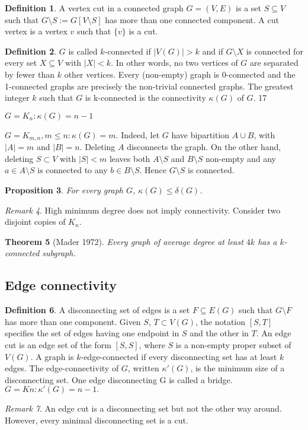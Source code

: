 \documentclass[11pt, fleqn, a4paper, landscape]{article}
\theoremstyle{plain} %
\newtheorem{thm}{Theorem}
\newtheorem{pro}[thm]{Proposition}
\theoremstyle{remark} %
\newtheorem{rem}[thm]{Remark}
\theoremstyle{definition} %
\newtheorem{defi}[thm]{Definition}
\begin{document}
\begin{multicols}{3}
\begin{defi}
A vertex cut in a connected graph $G = (V,E)$ is a set $ S \subseteq V$ such that $G\setminus S := G[V \setminus S]$ has more than one connected component. A cut vertex is a vertex $v$ such that $\{v\}$ is a cut.
\end{defi}
\begin{defi}
$G$ is called $k$-connected if $|V (G)|> k$ and if $G\setminus X$ is connected for every set $X \subseteq V$ with $|X|< k$. In other words, no two vertices of $G$ are separated by fewer than $k$ other vertices. Every (non-empty) graph is 0-connected and the 1-connected graphs are precisely the non-trivial connected graphs. The greatest integer $k$ such that $G$ is k-connected is the connectivity $\kappa (G)$ of $G$.
17
\item $G = K_n: \kappa (G) = n - 1$
\item $G = K_{m,n}, m \le n: \kappa (G) = m$. Indeed, let $G$ have bipartition $A \cup B$, with $|A|= m$  and $|B|= n$. Deleting $A$ disconnects the graph. On the other hand, deleting $S \subset V$ with $|S|< m$ leaves both $A\setminus S$ and $B\setminus S$ non-empty and any $a \in A\setminus S$ is connected to any $b \in B \setminus S$. Hence $G\setminus S$ is connected.
\end{defi}
\begin{pro}
For every graph $G$, $\kappa (G) \le \delta(G)$.
\end{pro} 

\begin{rem}
High minimum degree does not imply connectivity. Consider two disjoint copies of $K_n$.
\end{rem}
\begin{thm}[Mader 1972]
Every graph of average degree at least $4k$ has a $k$-connected subgraph.
\end{thm}

\subsection{Edge connectivity}
\begin{defi}
A disconnecting set of edges is a set $F \subseteq E(G)$ such that $G\setminus F$ has more than one component. Given $S$, $T \subset V (G)$, the notation $[S, T]$ specifies the set of edges having one endpoint
in $S$ and the other in $T$. An edge cut is an edge set of the form $[S, S]$, where $S$ is a non-empty proper subset of $V (G)$. A graph is $k$-edge-connected if every disconnecting set has at least $k$ edges.
The edge-connectivity of $G$, written $\kappa'(G)$, is the minimum size of a disconnecting set. One edge disconnecting G is called a bridge.
$G = Kn: \kappa'(G) = n - 1.$
\end{defi}
\addtocounter{thm}{1}
\begin{rem}
An edge cut is a disconnecting set but not the other way around. However, every minimal disconnecting set is a cut.
\end{rem}


\end{multicols}
\end{document}
